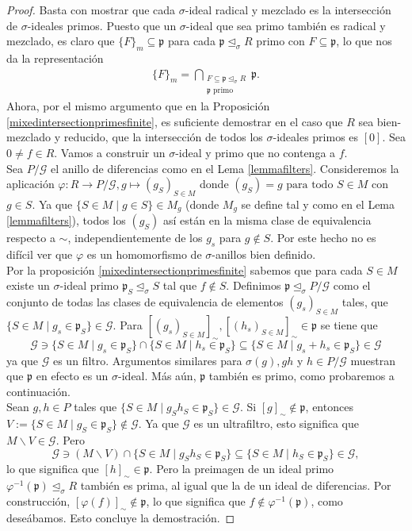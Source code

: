 \documentclass[letterpaper]{article}
\def\fa{\text{ para todo }}
\def\p{\mathfrak{p}}
\def\s{\sigma}
\def\si{\unlhd_{\sigma}}
\theoremstyle{definition}
\begin{document}
\begin{proof}
Basta con mostrar que cada $\sigma$-ideal radical y mezclado es la intersecci\'on de $\sigma$-ideales primos. Puesto que un $\sigma$-ideal que sea primo tambi\'en es radical y mezclado,
es claro que $\{F\}_m \subseteq \p$ para cada $\p \si R$ primo con $F \subseteq \p$, lo que nos da la representaci\'on
\begin{align*} \{F\}_m = \bigcap_{\substack{F \subseteq \p \si R \\ \p \text{ primo}}} \p. \end{align*}
Ahora, por el mismo argumento que en la Proposici\'on \ref{mixedintersectionprimesfinite}, es suficiente demostrar en el caso que $R$ sea bien-mezclado y reducido, que la intersecci\'on de todos los $\sigma$-ideales primos es $[0]$.
Sea $0 \neq f \in R$. Vamos a construir un $\sigma$-ideal y primo que no contenga a $f$.\\

Sea $P/\mathcal{G}$ el anillo de diferencias como en el Lema \ref{lemmafilters}. Consideremos la aplicaci\'on $\varphi: R \rightarrow P/\mathcal{G}, g \mapsto (g_S)_{S \in M}$ donde $(g_S) = g \fa S \in M$ con $g \in S$. 
Ya que $\{ S \in M \mid g \in S \} \in M_g$ (donde $M_g$ se define tal y como en el Lema \ref{lemmafilters}), todos los $(g_S)$ as\'i est\'an en la misma clase de equivalencia respecto a $\sim$, independientemente de los $g_s$ para $g \notin S$. 
Por este hecho no es dif\'icil ver que $\varphi$ es un homomorfismo de $\sigma$-anillos bien definido. \\

Por la proposici\'on \ref{mixedintersectionprimesfinite} sabemos que para cada $S \in M$ existe un $\s$-ideal primo $\p_S \si S$ tal que $f \notin S$. 
Definimos $\p \si P/\mathcal{G}$ como el conjunto de todas las clases de equivalencia de elementos $(g_s)_{S \in M}$ tales, que $\{ S \in M \mid g_s \in \p_S \} \in \mathcal{G}$. 
Para $[(g_s)_{S \in M}]_{\sim}, [(h_s)_{S \in M}]_{\sim} \in \p$ se tiene que $$ \mathcal{G} \ni \{ S \in M \mid  g_s \in \p_S \} \cap  \{ S \in M \mid  h_s \in \p_S \} \subseteq \{ S \in M \mid  g_s + h_s \in \p_S \} \in \mathcal{G}$$
ya que $\mathcal{G}$ es un filtro. Argumentos similares para $\s(g), gh$ y $h \in P/\mathcal{G}$ muestran que $\p$ en efecto es un $\sigma$-ideal. M\'as a\'un, $\p$ tambi\'en es primo, como probaremos a continuaci\'on.\\

Sean $g,h \in P$ tales que $\{ S \in M \mid g_Sh_S \in \p_S \} \in \mathcal{G}$. Si $[g]_\sim \notin \p$, entonces $V:= \{ S \in M \mid g_S \in \p_S \} \notin \mathcal{G}$. Ya que $\mathcal{G}$ es un ultrafiltro, 
esto significa que $M \backslash V \in \mathcal{G}$. Pero $$\mathcal{G} \ni (M \backslash V) \cap \{ S \in M \mid g_S h_S \in \p_S \} \subseteq \{ S \in M \mid h_S \in \p_S \} \in \mathcal{G},$$ lo que significa que $[h]_\sim \in \p$.
Pero la preimagen de un ideal primo $\varphi^{-1}(\p) \si R$ tambi\'en es prima, al igual que la de un ideal de diferencias. Por construcci\'on, $[\varphi(f)]_\sim \notin \p$, lo que significa que $f \notin \varphi^{-1}(\p)$, como dese\'abamos. Esto concluye la demostraci\'on.
\end{proof}
\end{document}
